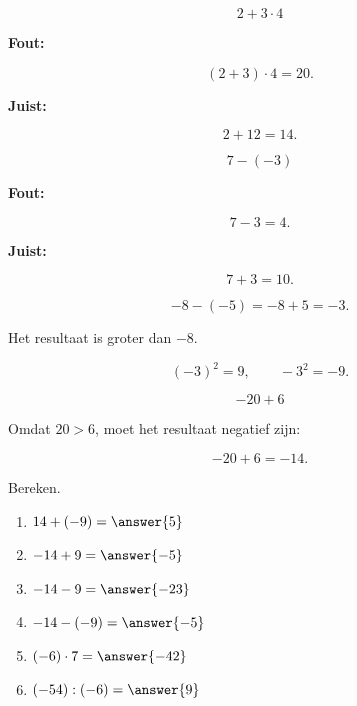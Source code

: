 \documentclass{ximera}
\begin{document}


\[
2+3\cdot4
\]

\textbf{Fout:}

\[
(2+3)\cdot4=20.
\]

\textbf{Juist:}

\[
2+12=14.
\]


\[
7-(-3)
\]

\textbf{Fout:}

\[
7-3=4.
\]

\textbf{Juist:}

\[
7+3=10.
\]


\[
-8-(-5)
=
-8+5
=
-3.
\]

Het resultaat is groter dan $-8$.


\[
(-3)^2=9,
\qquad
-3^2=-9.
\]


\[
-20+6
\]

Omdat $20>6$, moet het resultaat negatief zijn:

\[
-20+6=-14.
\]



\begin{exercise}
Bereken.

\begin{enumerate}
    \item $14+(-9)=\answer{5}$
    \item $-14+9=\answer{-5}$
    \item $-14-9=\answer{-23}$
    \item $-14-(-9)=\answer{-5}$
    \item $(-6)\cdot7=\answer{-42}$
    \item $(-54):(-6)=\answer{9}$
\end{enumerate}
\end{exercise}
\end{document}
